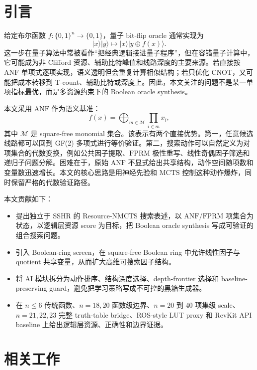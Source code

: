 \documentclass[UTF8,fontset=macnew,11pt]{ctexart}
\newcommand{\method}{Resource-NMCTS}
\newcommand{\screen}{Boolean-ring screen}
\newcommand{\anf}{\ensuremath{\mathrm{ANF}}}
\newcommand{\fprm}{\ensuremath{\mathrm{FPRM}}}
\newcommand{\mcts}{\ensuremath{\mathrm{MCTS}}}
\newcommand{\xor}{\ensuremath{\oplus}}
\newcommand{\ttable}{truth-table}
\begin{document}
\section{引言}

给定布尔函数 $f:\{0,1\}^n\rightarrow\{0,1\}$，量子 bit-flip oracle 通常实现为
\begin{equation}
  |x\rangle |y\rangle \mapsto |x\rangle |y\xor f(x)\rangle .
  \label{eq:oracle-v27}
\end{equation}
这一步在量子算法中常被看作“把经典逻辑接进量子程序”，但在容错量子计算中，它可能成为非 Clifford 资源、辅助比特峰值和线路深度的主要来源。若直接按 \anf{} 单项式逐项实现，语义透明但会重复计算相似结构；若只优化 CNOT，又可能把成本转移到 T-count、辅助比特或深度上。因此，本文关注的问题不是某一单项指标最优，而是多资源约束下的 Boolean oracle synthesis。

本文采用 \anf{} 作为语义基准：
\begin{equation}
  f(x)=\bigoplus_{m\in\mathcal{M}}\prod_{i\in m}x_i ,
  \label{eq:anf-v27}
\end{equation}
其中 $\mathcal{M}$ 是 square-free monomial 集合。该表示有两个直接优势。第一，任意候选线路都可以回到 GF(2) 多项式进行等价验证。第二，搜索动作可以自然定义为对项集合的代数变换，例如公共因子提取、\fprm{} 极性重写、线性奇偶因子筛选和递归子问题分解。困难在于，原始 \anf{} 不显式给出共享结构，动作空间随项数和变量数迅速增长。本文的核心思路是用神经先验和 \mcts{} 控制这种动作爆炸，同时保留严格的代数验证路径。

本文贡献如下：
\begin{itemize}
  \item 提出独立于 SSHR 的 \method{} 搜索表述，以 \anf{}/\fprm{} 项集合为状态，以逻辑层资源 score 为目标，把 Boolean oracle synthesis 写成可验证的组合搜索问题。
  \item 引入 \screen{}，在 square-free Boolean ring 中允许线性因子与 quotient 共享变量，从而扩大高维可搜索因子结构。
  \item 将 AI 模块拆分为动作排序、结构深度选择、depth-frontier 选择和 baseline-preserving guard，避免把学习策略写成不可控的黑箱生成器。
  \item 在 $n\leq6$ 传统函数、$n=18,20$ 函数级边界、$n=20$ 到 $40$ 项集级 scale、$n=21,22,23$ 完整 \ttable{} bridge、ROS-style LUT proxy 和 RevKit API baseline 上给出逻辑层资源、正确性和边界证据。
\end{itemize}

\section{相关工作}
\end{document}
